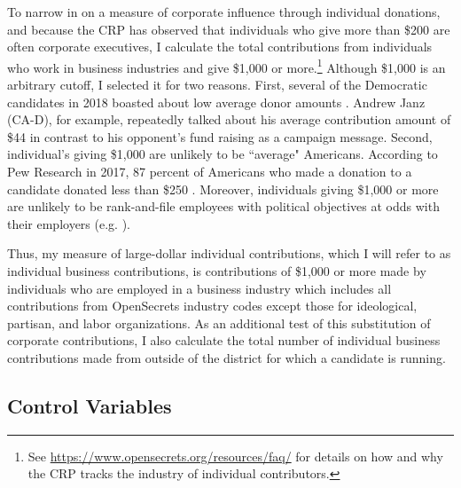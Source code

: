 \documentclass[12pt]{article}
\begin{document}
To narrow in on a measure of corporate influence through individual donations, and because the CRP has observed that individuals who give more than \$200 are often corporate executives, I calculate the total contributions from individuals who work in business industries and give \$1,000 or more.\footnote{See \href{https://www.opensecrets.org/resources/faq/}{https://www.opensecrets.org/resources/faq/} for details on how and why the CRP tracks the industry of individual contributors.} Although \$1,000 is an arbitrary cutoff, I selected it for two reasons. First, several of the Democratic candidates in 2018 boasted about low average donor amounts \citep{opensecrets.org2018}. Andrew Janz (CA-D), for example, repeatedly talked about his average contribution amount of \$44 in contrast to his opponent's fund raising as a campaign message. Second, individual's giving \$1,000 are unlikely to be ``average" Americans. According to Pew Research in 2017, 87 percent of Americans who made a donation to a candidate donated less than \$250 \citep{hughes2017}. Moreover, individuals giving \$1,000 or more are unlikely to be rank-and-file employees with political objectives at odds with their employers (e.g. \cite{li2018}).

Thus, my measure of large-dollar individual contributions, which I will refer to as individual business contributions, is contributions of \$1,000 or more made by individuals who are employed in a business industry which includes all contributions from OpenSecrets industry codes except those for ideological, partisan, and labor organizations. As an additional test of this substitution of corporate contributions, I also calculate the total number of individual business contributions made from outside of the district for which a candidate is running.

\subsection{Control Variables}
\end{document}
